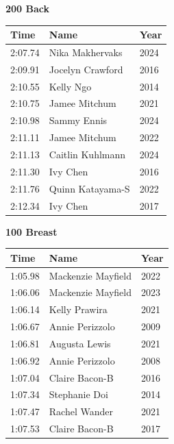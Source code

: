 \vspace{1.2em}
\noindent\begin{minipage}[t]{0.48\textwidth}
\centering
\textbf{\textcolor{teamprimary}{200 Back}}\par
\vspace{0.5em}
\centering
\small
\renewcommand{\arraystretch}{1.0}
\setlength{\tabcolsep}{4pt}
\begin{tabular}{@{}p{1.8cm}p{3.0cm}p{1.0cm}@{}}
\toprule
\textbf{Time} & \textbf{Name} & \textbf{Year} \\
\midrule
2:07.74 & Nika Makhervaks & 2024 \\
2:09.91 & Jocelyn Crawford & 2016 \\
2:10.55 & Kelly Ngo & 2014 \\
2:10.75 & Jamee Mitchum & 2021 \\
2:10.98 & Sammy Ennis & 2024 \\
2:11.11 & Jamee Mitchum & 2022 \\
2:11.13 & Caitlin Kuhlmann & 2024 \\
2:11.30 & Ivy Chen & 2016 \\
2:11.76 & Quinn Katayama-S & 2022 \\
2:12.34 & Ivy Chen & 2017 \\
\bottomrule
\end{tabular}
\end{minipage}
\hfill
\begin{minipage}[t]{0.48\textwidth}
\centering
\textbf{\textcolor{teamprimary}{100 Breast}}\par
\vspace{0.5em}
\centering
\small
\renewcommand{\arraystretch}{1.0}
\setlength{\tabcolsep}{4pt}
\begin{tabular}{@{}p{1.8cm}p{3.0cm}p{1.0cm}@{}}
\toprule
\textbf{Time} & \textbf{Name} & \textbf{Year} \\
\midrule
1:05.98 & Mackenzie Mayfield & 2022 \\
1:06.06 & Mackenzie Mayfield & 2023 \\
1:06.14 & Kelly Prawira & 2021 \\
1:06.67 & Annie Perizzolo & 2009 \\
1:06.81 & Augusta Lewis & 2021 \\
1:06.92 & Annie Perizzolo & 2008 \\
1:07.04 & Claire Bacon-B & 2016 \\
1:07.34 & Stephanie Doi & 2014 \\
1:07.47 & Rachel Wander & 2021 \\
1:07.53 & Claire Bacon-B & 2017 \\
\bottomrule
\end{tabular}
\end{minipage}
